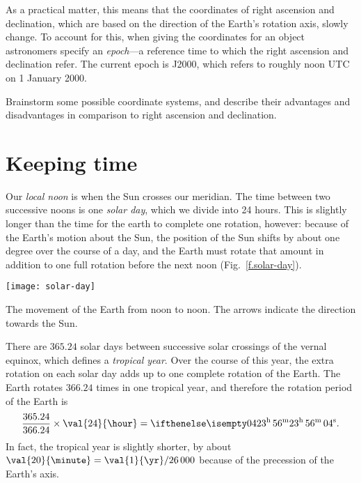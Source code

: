 As a practical matter, this means that the coordinates of right ascension and declination, which are based on the direction of the Earth's rotation axis, slowly change.  To account for this, when giving the coordinates for an object astronomers specify an \emph{epoch}---a reference time to which the right ascension and declination refer. The current epoch is J2000, which refers to roughly noon UTC on 1 January 2000.

\begin{exercisebox}
Brainstorm some possible coordinate systems, and describe their advantages and disadvantages in comparison to right ascension and declination.
\end{exercisebox}

\section{Keeping time}

Our \emph{local noon} is when the Sun crosses our meridian. The time between two successive noons is one \emph{solar day}, which we divide into 24 hours. This is slightly longer than the time for the earth to complete one rotation, however: because of the Earth's motion about the Sun, the position of the Sun shifts by about one degree over the course of a day, and the Earth must rotate that amount in addition to one full rotation before the next noon (Fig.~\ref{f.solar-day}).

\begin{marginfigure}
\texttt{[image: solar-day]}
\caption[The movement of the Earth from noon to noon]{The movement of the Earth from noon to noon.  The arrows indicate the direction towards the Sun.}
\label{f.solar-day}
\end{marginfigure}

There are $365.24$ solar days between successive solar crossings of the vernal equinox, which defines a \emph{tropical year}.  Over the course of this year, the extra rotation on each solar day adds up to one complete rotation of the Earth.  The Earth rotates $366.24$ times in one tropical year, and therefore the rotation period of the Earth is
\[ \frac{365.24}{366.24}\times \val{24}{\hour} =  \hrangle{23}{56}{04}.  \]
In fact, the tropical year is slightly shorter, by about $\val{20}{\minute} = \val{1}{\yr}/26\,000$ because of the precession of the Earth's axis.

